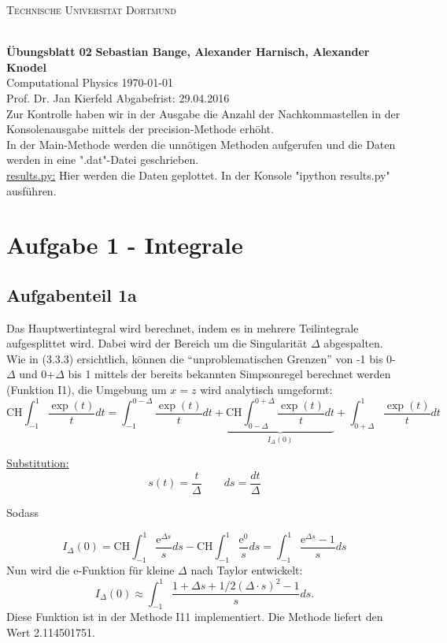 
\usepackage{hyperref}

\noindent
\centerline{\small{\textsc{Technische Universität Dortmund}}} \\
\large\textbf{Übungsblatt 02} \hfill \footnotesize\textbf{Sebastian Bange, Alexander Harnisch, Alexander Knodel} \\
\normalsize Computational Physics \hfill \today \\
Prof. Dr. Jan Kierfeld \hfill Abgabefrist: 29.04.2016\\
\noindent\makebox[\linewidth]{\rule{\textwidth}{0.4pt}}
Zur Kontrolle haben wir in der Ausgabe die Anzahl der Nachkommastellen in der Konsolenausgabe mittels der precision-Methode erhöht.\\
In der Main-Methode werden die unnötigen Methoden aufgerufen und die Daten werden in eine ".dat"-Datei geschrieben. \\
\underline{results.py:}
Hier werden die Daten geplottet. In der Konsole "ipython results.py" ausführen.
\section*{Aufgabe 1 - Integrale}
\subsection*{Aufgabenteil 1a}
Das Hauptwertintegral wird berechnet, indem es in mehrere Teilintegrale aufgesplittet wird. Dabei
wird der Bereich um die Singularität $\Delta$ abgespalten. Wie in (3.3.3)\cite[39]{script} ersichtlich, können
die \enquote{unproblematischen Grenzen} von -1 bis 0-$\Delta$ und 0+$\Delta$ bis 1 mittels der
bereits bekannten Simpsonregel berechnet werden (Funktion I1), die Umgebung um $x = z$ wird
analytisch umgeformt: \begin{equation*}
\text{CH} \int_{-1}^{1} \frac{\exp(t)}{t} dt = \int_{-1}^{0-\Delta}\frac{\exp(t)}{t}dt+\underbrace{\text{CH}\int_{0-\Delta}^{0+\Delta}\frac{\exp(t)}{t}dt}_{I_{\Delta}(0)}+\int_{0+\Delta}^1\frac{\exp(t)}{t}dt
\end{equation*}

\underline{Substitution:}
\begin{equation*}
s(t) = \frac{t}{\Delta} \qquad ds = \frac{dt}{\Delta}
\end{equation*}

Sodass

\begin{equation*}
I_{\Delta}(0) = \text{CH} \int_{-1}^{1} \frac{\mathup{e}^{\Delta s}}{s} ds - \text{CH} \int_{-1}^1 \frac{\mathup{e}^0}{s} ds = \int_{-1}^{1} \frac{\mathup{e}^{\Delta s}-1}{s} ds
\end{equation*}
Nun wird die e-Funktion für kleine $\Delta$ nach Taylor entwickelt:
\begin{equation*}
I_{\Delta}(0) \approx \int_{-1}^{1} \frac{1+\Delta s + 1/2 \left(\Delta \cdot s\right)^2 -1}{s} ds.
\end{equation*}
Diese Funktion ist in der Methode I11 implementiert. Die Methode liefert den Wert 2.114501751.


